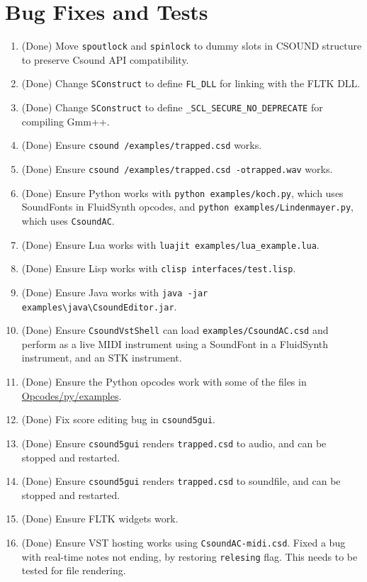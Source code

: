 \documentclass[11pt,letterpaper,onecolumn]{scrartcl}
\begin{document}
\begin{sloppypar}
\section{Bug Fixes and Tests}
\label{sec:BugFixesAndTests}

\begin{enumerate}
	\item (Done) Move \texttt{spoutlock} and \texttt{spinlock} to dummy slots in CSOUND structure to preserve Csound API compatibility.
	\item (Done) Change \texttt{SConstruct} to define \verb|FL_DLL| for linking with the FLTK DLL.
	\item (Done) Change \texttt{SConstruct} to define \verb|_SCL_SECURE_NO_DEPRECATE| for compiling Gmm++.
	\item (Done) Ensure \texttt{csound /examples/trapped.csd} works.
	\item (Done) Ensure \texttt{csound /examples/trapped.csd -otrapped.wav} works.
	\item (Done) Ensure Python works with \texttt{python examples/koch.py}, which uses SoundFonts in FluidSynth opcodes, and \texttt{python examples/Lindenmayer.py}, which uses \texttt{CsoundAC}. 
	\item (Done) Ensure Lua works with \verb|luajit examples/lua_example.lua|.
	\item (Done) Ensure Lisp works with \verb|clisp interfaces/test.lisp|.
	\item (Done) Ensure Java works with \verb|java -jar examples\java\CsoundEditor.jar|.
	\item (Done) Ensure \texttt{CsoundVstShell} can load \texttt{examples/CsoundAC.csd} and perform as a live MIDI instrument using a SoundFont in a FluidSynth instrument, and an STK instrument.
	\item (Done) Ensure the Python opcodes work with some of the files in \url{Opcodes/py/examples}.
	\item (Done) Fix score editing bug in \texttt{csound5gui}.
	\item (Done) Ensure \texttt{csound5gui} renders \texttt{trapped.csd} to audio, and can be stopped and restarted.
	\item (Done) Ensure \texttt{csound5gui} renders \texttt{trapped.csd} to soundfile, and can be stopped and restarted. 	
	\item (Done) Ensure FLTK widgets work. 	
	\item (Done) Ensure VST hosting works using \verb|CsoundAC-midi.csd|. Fixed a bug with real-time notes not ending, by restoring \texttt{relesing} flag. This needs to be tested for file rendering.

\end{enumerate}
\end{sloppypar}
\end{document}
